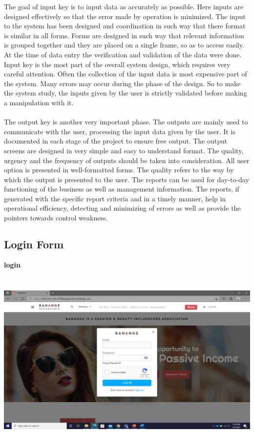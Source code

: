 The goal of input key is to input data as accurately as possible. Here inputs are designed effectively so that the error made by operation is minimized. The input to the system has been designed and coordination in such way that there format is similar in all forms. Forms are designed in such way that relevant information is
grouped together and they are placed on a single frame, so as to access easily. At the time of data entry the verification and validation of the data were done. Input key is the most part of the overall system design, which requires very careful attention.
Often the collection of the input data is most expensive part of the system. Many errors may occur during the phase of the design. So to make the system study, the inputs given by the user is strictly validated before making a manipulation with it.
\\
\\
The output key is another very important phase. The outputs are mainly used to communicate with the user, processing the input data given by the user. It is documented in each stage of the project to ensure free output. The output screens are designed in very simple and easy to understand format. The quality, urgency and the frequency of outputs should be taken into consideration. All user option is presented in well-formatted forms. The quality refers to the way by which the output is presented to the user. The reports can be used for day-to-day functioning of the business as well as management information. The reports, if generated with the specific report criteria and in a timely manner, help in operational efficiency, detecting and minimizing of errors as well as provide the pointers towards control weakness.		
		
		
		
\pagebreak
\subsection{Login Form}
\textbf{login}
\begin{center}
\includegraphics[height=9cm,width=14cm]{Admin/user-login.png}
\end{center}

